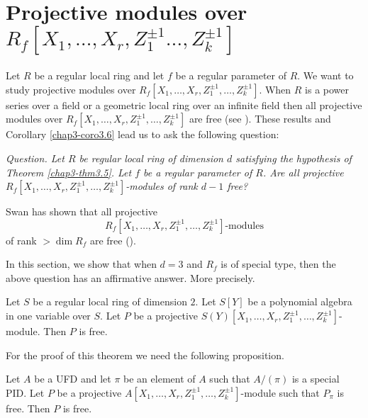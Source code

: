 \section{Projective modules over
{\fontsize{12}{14}\selectfont\texorpdfstring{$R_{f}[X_{1},\ldots,X_{r},Z^{\pm 1}_{1}\ldots,Z^{\pm 1}_{k}]$}{Rf}}}\label{chap3-sec4}

Let $R$ be a regular local ring and let $f$ be a regular parameter of
$R$. We want to study projective modules over
$R_{f}[X_{1},\ldots,X_{r},Z^{\pm 1}_{1},\ldots,Z^{\pm 1}_{k}]$. 
When $R$ is a power series over a field or a geometric local ring over
an infinite field then all projective modules over
$R_{f}[X_{1},\ldots,X_{r},Z^{\pm 1}_{1},\ldots,Z^{\pm 1}_{k}]$ are
free (see \cite[Theorem 3.1 and Theorem 2.2]{chap3-B-R}). These
results and Corollary \ref{chap3-coro3.6} lead us to ask the following
question: 

\noindent 
{\em Question. Let $R$ be regular local ring of dimension $d$
satisfying the hypothesis of Theorem \ref{chap3-thm3.5}. Let $f$ be a
regular parameter of $R$. Are all projective
$R_{f}[X_{1},\ldots,X_{r},Z^{\pm 1}_{1},\ldots,Z^{\pm 1}_{k}]$-modules
of rank $d-1$ free?}

\begin{remark}\label{chap3-rem4.1}
Swan has shown that all projective 
$$
R_{f}[X_{1},\ldots,X_{r},Z^{\pm
1}_{1},\ldots,Z^{\pm 1}_{k}]\text{-modules}
$$
\pageoriginale of rank $>\dim
R_{f}$ are free (\cite[Theorem 1.1.]{chap3-Sw}).
\end{remark}

In this section, we show that when $d=3$ and $R_{f}$ is of special
type, then the above question has an affirmative answer. More
precisely. 

\begin{theorem}\label{chap3-thm4.2}
Let $S$ be a regular local ring of dimension $2$. Let $S[Y]$ be a
polynomial algebra in one variable over $S$. Let $P$ be a projective
$S(Y)[X_{1},\ldots,X_{r},Z^{\pm 1}_{1},\ldots,Z^{\pm
1}_{k}]$-module. Then $P$ is free.
\end{theorem}

For the proof of this theorem we need the following proposition.

\begin{proposition}\label{chap3-prop4.3}
Let $A$ be a UFD and let $\pi$ be an element of $A$ such that
$A/(\pi)$ is a special PID. Let $P$ be a projective
$A[X_{1},\ldots,X_{r},Z^{\pm 1}_{1},\ldots,Z^{\pm 1}_{k}]$-module such
that $P_{\pi}$ is free. Then $P$ is free.
\end{proposition}

